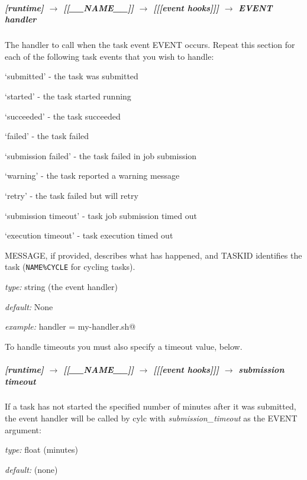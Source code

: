 \subparagraph[EVENT handler]{[runtime] $\rightarrow$ [[\_\_NAME\_\_]] $\rightarrow$ [[[event hooks]]] $\rightarrow$ EVENT handler}

The handler to call when the task event EVENT occurs. Repeat this
section for each of the following task events that you wish to handle:
\begin{myitemize}
    \item `submitted' - the task was submitted
    \item `started' - the task started running 
    \item `succeeded' - the task succeeded
    \item `failed' - the task failed
    \item `submission failed' - the task failed in job submission
    \item `warning' - the task reported a warning message
    \item `retry' - the task failed but will retry
    \item `submission timeout' - task job submission timed out
    \item `execution timeout' - task execution timed out
\end{myitemize}
MESSAGE, if provided, describes what has happened, and TASKID identifies
the task (\lstinline=NAME%CYCLE= for cycling tasks).

\begin{myitemize}
    \item {\em type:} string (the event handler)
    \item {\em default:} None
    \item {\em example:} \lstinline@failed handler = my-handler.sh@
\end{myitemize}

To handle timeouts you must also specify a timeout value, below.

\subparagraph[submission timeout]{[runtime] $\rightarrow$ [[\_\_NAME\_\_]] $\rightarrow$ [[[event hooks]]] $\rightarrow$ submission timeout}

If a task has not started the specified number of minutes after it was
submitted, the event handler will be called by cylc with 
{\em submission\_timeout} as the EVENT argument:
\begin{myitemize}
    \item {\em type:} float (minutes)
    \item {\em default:} (none)
\end{myitemize}

